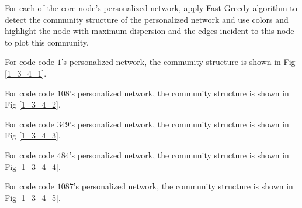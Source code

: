 \documentclass[11pt]{article}
\begin{document}
For each of the core node’s personalized network, apply Fast-Greedy algorithm to detect the community structure of the personalized network and use colors and highlight the node with maximum dispersion and the edges incident to this node to plot this community.

For code code $1$’s personalized network, the community structure is shown in Fig \ref{1_3_4_1}.

For code code $108$’s personalized network, the community structure is shown in Fig \ref{1_3_4_2}.

For code code $349$’s personalized network, the community structure is shown in Fig \ref{1_3_4_3}.

For code code $484$’s personalized network, the community structure is shown in Fig \ref{1_3_4_4}.

For code code $1087$’s personalized network, the community structure is shown in Fig \ref{1_3_4_5}.
\end{document}
